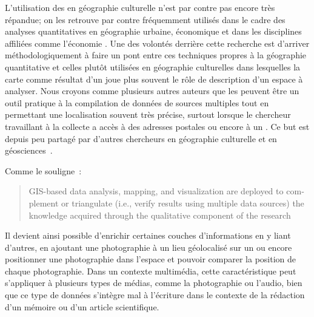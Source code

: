 L'utilisation des \sig{} en géographie culturelle n'est par contre pas encore très répandue; on les retrouve par contre fréquemment utilisés dans le cadre des analyses quantitatives en géographie urbaine, économique et dans les disciplines affiliées comme l'économie \missref{}. 
Une des volontés derrière cette recherche est d'arriver méthodologiquement à faire un pont entre ces techniques propres à la géographie quantitative et celles plutôt utilisées en géographie culturelles dans lesquelles la carte comme résultat d'un \sig{} joue plus souvent le rôle de description d'un espace à analyser. 
Nous croyons comme plusieurs autres auteurs \citep[4]{Elwood2009} que les \sig{} peuvent être un outil pratique à la compilation de données de sources multiples tout en permettant une localisation souvent très précise, surtout lorsque le chercheur travaillant à la collecte a accès à des adresses postales ou encore à un \gps.
Ce but est depuis peu partagé par d'autres chercheurs en géographie culturelle et en géosciences~\citep{Perkins2003,Elwood2011,Elwood2009,Kwan2008,Madden2009,Knigge2006,Jung2010}.


Comme le souligne~\cite{Kwan2008}: \foreignblockquote{english}[{\citeyear[444]{Kwan2008}}][.]{GIS-based data   analysis, mapping, and visualization are deployed to complement or triangulate   (i.e., verify results using multiple data sources) the knowledge acquired through the qualitative component of the research} 
Il devient ainsi possible d'enrichir certaines couches d'informations en y liant d'autres, en ajoutant une photographie à un lieu géolocalisé sur un \sig{} ou encore positionner une photographie dans l'espace et pouvoir comparer la position de chaque photographie. 
Dans un contexte multimédia, cette caractéristique peut s'appliquer à plusieurs types de médias, comme la photographie ou l'audio, bien que ce type de données s'intègre mal à l'écriture dans le contexte de la rédaction d'un mémoire ou d'un article scientifique.

